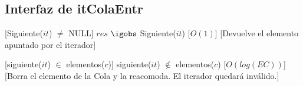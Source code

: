 \begin{Interfaz}
\subsection{Interfaz de itColaEntr}

%
[Siguiente($it$) $\not=$ NULL]   %
{$res$ $\igobs$ Siguiente($it$)} %
[$O(1)$]   %
[Devuelve el elemento apuntado por el iterador]  %

[siguiente($it$) $\in$ elementos($c$)]
{siguiente($it$) $\not\in$ elementos($c$)}
[$O(log(EC))$]
[Borra el elemento de la Cola y la reacomoda. El iterador quedar\'a inv\'alido.]
\end{Interfaz}